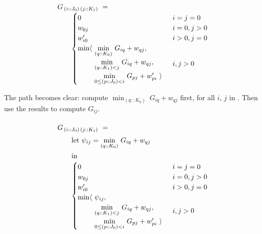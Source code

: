 \begin{equation}\LeftEqNo
\renewcommand\arraystretch{1.5}
\begin{array}{l@{}l}
	G_{\,(i :: J_0)\,(j :: K_1)} ~=~  \\
	\qquad
	\begin{cases}
		0                        & i=j=0 \\
		w_{0j}                   & i=0, j>0 \\
		w'_{i0}                  & i>0, j=0 \\
		\begin{array}{@{}l@{~}l}
		  \min\langle & \underset{(q::K_0)}\min ~ G_{iq} + w_{qj}, \\
		              & \underset{(q::K_1) <j}\min ~ G_{iq} + w_{qj}, \\
		              & \underset{0\leq (p::J_0) <i}\min ~ G_{pj} + w'_{pi}~\rangle
		\end{array}              & i,j>0
	\end{cases}
\end{array}
\end{equation}

The path becomes clear: compute $\min_{(q::K_0)} ~ G_{iq} + w_{qj}$ first, for all $i$, $j$
in . Then use the results to compute $G_{ij}$.

\begin{equation}\LeftEqNo
\renewcommand\arraystretch{1.5}
\begin{array}{l@{}l}
	G_{\,(i :: J_0)\,(j :: K_1)} ~=~  \\
	\qquad
	\textrm{let}~\psi_{ij} = \underset{(q::K_0)}\min ~ G_{iq} + w_{qj} \\
	\qquad\textrm{in} \\
	\qquad
	\begin{cases}
		0                        & i=j=0 \\
		w_{0j}                   & i=0, j>0 \\
		w'_{i0}                  & i>0, j=0 \\
		\begin{array}{@{}l@{~}l}
		  \min\langle & \psi_{ij}, \\
		              & \underset{(q::K_1) <j}\min ~ G_{iq} + w_{qj}, \\
		              & \underset{0\leq (p::J_0) <i}\min ~ G_{pj} + w'_{pi}~\rangle
		\end{array}              & i,j>0
	\end{cases}
\end{array}
\label{intro:let in 2}
\end{equation}

